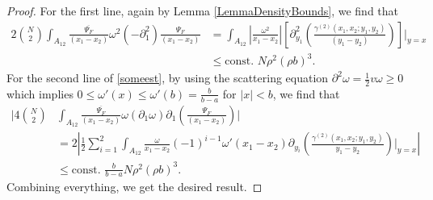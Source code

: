 \documentclass[a4paper,11pt]{article}
\newcommand{\abs}[1]{\left\lvert #1 \right\rvert}
\numberwithin{equation}{section}
\begin{document}
\begin{proof}
		For the first line, again by Lemma \ref{LemmaDensityBounds}, we find that \begin{equation}
		\begin{aligned}
		2\binom{N}{2}\int_{A_{12}}\frac{\overline{\Psi_F}}{(x_1-x_2)}\omega^2(-\partial^2_1)\frac{\Psi_F}{(x_1-x_2)}&=\int_{A_{12}}\abs{\frac{\omega^2}{x_1-x_2}}\left[\partial^2_{y_1}\left(\frac{\gamma^{(2)}(x_1,x_2;y_1,y_2)}{(y_1-y_2)}\right)\right]\Big\rvert_{y=x}\\&\leq\text{const. }N\rho^2 (\rho b)^3.
		\end{aligned}
		\end{equation}
		For the second line of \eqref{someest}, by using the scattering equation $ \partial^2\omega=\frac{1}{2}v\omega\geq0 $ which implies $ 0\leq\omega'(x)\leq \omega'(b)=\frac{b}{b-a} $ for $ \abs{x}<b $, we find that \begin{equation}
		\begin{aligned}
		\Bigg\lvert4\binom{N}{2}&\int_{A_{12}}\frac{\overline{\Psi_F}}{(x_1-x_2)}\omega(\partial_{1}\omega)\partial_1\left(\frac{\Psi_F}{(x_1-x_2)}\right)\Bigg\rvert\\&=2\abs{\frac12\sum_{i=1}^{2}\int_{A_{12}}\frac{\omega}{x_1-x_2}(-1)^{i-1}\omega'(x_1-x_2)\partial_{y_i}\left(\frac{\gamma^{(2)}(x_1,x_2;y_1,y_2)}{y_1-y_2}\right)\Bigg\rvert_{y=x}}\\
		&\leq \text{const. }\frac{b}{b-a}N\rho^2(\rho b)^3.
		\end{aligned}
		\end{equation}
		Combining everything, we get the desired result.

	\end{proof}
\end{document}
